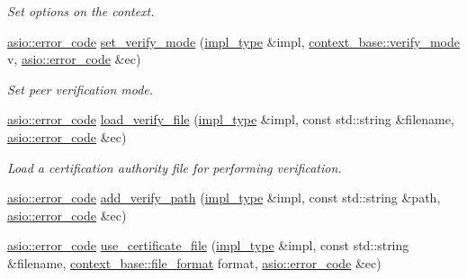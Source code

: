 \begin{DoxyCompactItemize}
\begin{DoxyCompactList}\small\item\em Set options on the context. \end{DoxyCompactList}\item 
\hyperlink{classasio_1_1error__code}{asio\+::error\+\_\+code} \hyperlink{classasio_1_1ssl_1_1old_1_1context__service_a53dbf80e2822b032c6ec76ede3b0ab0c}{set\+\_\+verify\+\_\+mode} (\hyperlink{classasio_1_1ssl_1_1old_1_1context__service_aa082808edcf9f9da07eaf4077d1d8de0}{impl\+\_\+type} \&impl, \hyperlink{classasio_1_1ssl_1_1context__base_aa9ef38ba747dd4e8ecb1f9a279a67d6b}{context\+\_\+base\+::verify\+\_\+mode} v, \hyperlink{classasio_1_1error__code}{asio\+::error\+\_\+code} \&ec)
\begin{DoxyCompactList}\small\item\em Set peer verification mode. \end{DoxyCompactList}\item 
\hyperlink{classasio_1_1error__code}{asio\+::error\+\_\+code} \hyperlink{classasio_1_1ssl_1_1old_1_1context__service_a2b479bc43d6fff2d5af2acf7704c095e}{load\+\_\+verify\+\_\+file} (\hyperlink{classasio_1_1ssl_1_1old_1_1context__service_aa082808edcf9f9da07eaf4077d1d8de0}{impl\+\_\+type} \&impl, const std\+::string \&filename, \hyperlink{classasio_1_1error__code}{asio\+::error\+\_\+code} \&ec)
\begin{DoxyCompactList}\small\item\em Load a certification authority file for performing verification. \end{DoxyCompactList}\item 
\hyperlink{classasio_1_1error__code}{asio\+::error\+\_\+code} \hyperlink{classasio_1_1ssl_1_1old_1_1context__service_a5cc85cb3b438cc006be494f9b44a8446}{add\+\_\+verify\+\_\+path} (\hyperlink{classasio_1_1ssl_1_1old_1_1context__service_aa082808edcf9f9da07eaf4077d1d8de0}{impl\+\_\+type} \&impl, const std\+::string \&path, \hyperlink{classasio_1_1error__code}{asio\+::error\+\_\+code} \&ec)
\item 
\hyperlink{classasio_1_1error__code}{asio\+::error\+\_\+code} \hyperlink{classasio_1_1ssl_1_1old_1_1context__service_a0dbc337e619e4d74d91c126f42e9c1c0}{use\+\_\+certificate\+\_\+file} (\hyperlink{classasio_1_1ssl_1_1old_1_1context__service_aa082808edcf9f9da07eaf4077d1d8de0}{impl\+\_\+type} \&impl, const std\+::string \&filename, \hyperlink{classasio_1_1ssl_1_1context__base_acc846aa73fffcab1fecad36dcf2be1fb}{context\+\_\+base\+::file\+\_\+format} format, \hyperlink{classasio_1_1error__code}{asio\+::error\+\_\+code} \&ec)

\end{DoxyCompactItemize}
